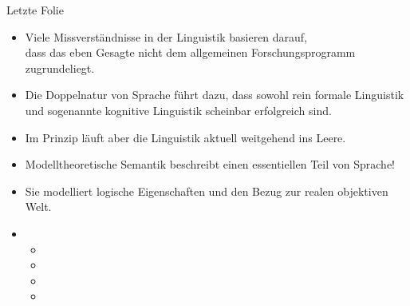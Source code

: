 \begin{frame}
  {Letzte Folie}
  \onslide<+->
  \begin{itemize}[<+->]
    \item Viele Missverständnisse in der Linguistik basieren darauf,\\
      dass das eben Gesagte nicht dem allgemeinen Forschungsprogramm zugrundeliegt.
    \item Die Doppelnatur von Sprache führt dazu, dass sowohl rein formale Linguistik\\
      und sogenannte kognitive Linguistik scheinbar erfolgreich sind.
    \item Im Prinzip läuft aber die Linguistik aktuell weitgehend ins Leere.
      \Halbzeile
    \item \alert{Modelltheoretische Semantik beschreibt einen essentiellen Teil von Sprache!}
    \item \alert{Sie modelliert logische Eigenschaften und den Bezug zur realen objektiven Welt.}
      \Halbzeile
    \item {}
      \begin{itemize}[<+->]
        \item {}
        \item {}
        \item {}
        \item {}
      \end{itemize}
  \end{itemize}
\end{frame}
